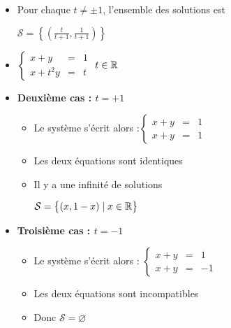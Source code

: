 \begin{frame}
\begin{exemple}
\begin{itemize}
\begin{itemize}
    \item Pour chaque $t\neq \pm1$, l'ensemble des solutions est
    
\centerline{$\mathcal{S}= \left\lbrace \left(\frac{t}{t+1},\frac{1}{t+1}\right) \right\rbrace$}
  \end{itemize}
  
\end{itemize}

\end{exemple}

\end{frame}


\begin{frame}
\begin{exemple}
\begin{itemize}
  \item $
\left\{\begin{array}{rcl} 
 x + y  & = & 1\\
 x + t^2 y & = & t 
\end{array}\right.  
$ 
\qquad  $t\in \mathbb{R}$

  \item \textbf{Deuxième cas : $t=+1$}
\pause  
  \begin{itemize}
    \item Le système s'écrit alors :$
\left\{\begin{array}{rcl} 
 x + y  & = & 1\\
 x + y & = & 1 
\end{array}\right.  
$ 

\pause

    \item Les deux équations sont identiques
\pause  
    \item Il y a une infinité de solutions 
  
  \centerline{$\mathcal{S}= \big\lbrace (x,1-x) \mid x\in \mathbb{R} \big\rbrace$}
  \end{itemize}
\pause

  \item \textbf{Troisième cas : $t=-1$}
  
\pause  
  \begin{itemize}
    \item Le système s'écrit alors :
$
\left\{\begin{array}{rcl} 
 x + y  & = & 1\\
 x + y & = & -1 
\end{array}\right.$

  \pause
  
    \item Les deux équations sont incompatibles 
  \pause
    \item Donc $\mathcal{S}= \varnothing$
  \end{itemize}
\end{itemize}
\end{exemple}

\end{frame}

